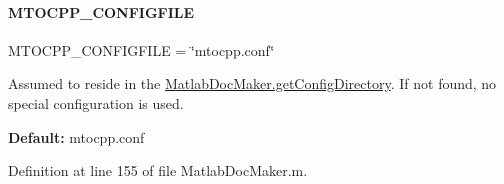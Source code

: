 \paragraph{\texorpdfstring{M\+T\+O\+C\+P\+P\+\_\+\+C\+O\+N\+F\+I\+G\+F\+I\+LE}{MTOCPP\_CONFIGFILE}}
{\footnotesize\ttfamily M\+T\+O\+C\+P\+P\+\_\+\+C\+O\+N\+F\+I\+G\+F\+I\+LE = \char`\"{}mtocpp.\+conf\char`\"{}\hspace{0.3cm}{\ttfamily [static]}}

Assumed to reside in the \hyperlink{class_matlab_doc_maker_ac201c45057310993a26a114403254c41}{Matlab\+Doc\+Maker.\+get\+Config\+Directory}. If not found, no special configuration is used.

{\bfseries Default\+:} {\ttfamily mtocpp.\+conf} 

Definition at line 155 of file Matlab\+Doc\+Maker.\+m.

